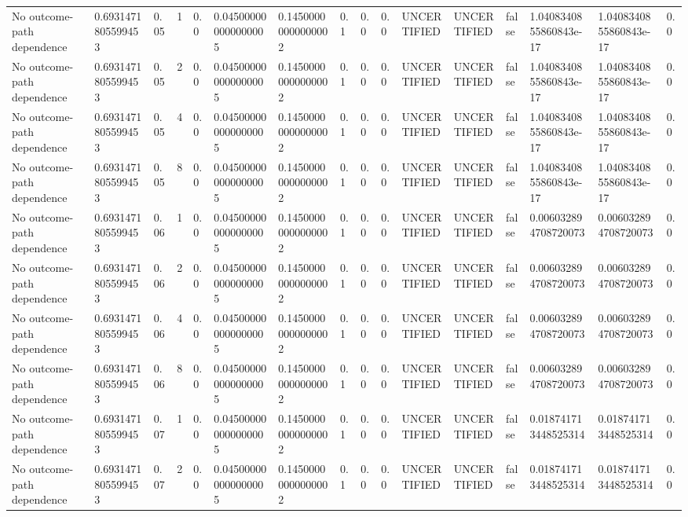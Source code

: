 \begin{tabular}{llllllllllllllll}
No outcome-path dependence & 0.6931471805599453 & 0.05 & 1 & 0.0 & 0.045000000000000005 & 0.14500000000000002 & 0.1 & 0.0 & 0.0 & UNCERTIFIED & UNCERTIFIED & false & 1.0408340855860843e-17 & 1.0408340855860843e-17 & 0.0 \\
No outcome-path dependence & 0.6931471805599453 & 0.05 & 2 & 0.0 & 0.045000000000000005 & 0.14500000000000002 & 0.1 & 0.0 & 0.0 & UNCERTIFIED & UNCERTIFIED & false & 1.0408340855860843e-17 & 1.0408340855860843e-17 & 0.0 \\
No outcome-path dependence & 0.6931471805599453 & 0.05 & 4 & 0.0 & 0.045000000000000005 & 0.14500000000000002 & 0.1 & 0.0 & 0.0 & UNCERTIFIED & UNCERTIFIED & false & 1.0408340855860843e-17 & 1.0408340855860843e-17 & 0.0 \\
No outcome-path dependence & 0.6931471805599453 & 0.05 & 8 & 0.0 & 0.045000000000000005 & 0.14500000000000002 & 0.1 & 0.0 & 0.0 & UNCERTIFIED & UNCERTIFIED & false & 1.0408340855860843e-17 & 1.0408340855860843e-17 & 0.0 \\
No outcome-path dependence & 0.6931471805599453 & 0.06 & 1 & 0.0 & 0.045000000000000005 & 0.14500000000000002 & 0.1 & 0.0 & 0.0 & UNCERTIFIED & UNCERTIFIED & false & 0.006032894708720073 & 0.006032894708720073 & 0.0 \\
No outcome-path dependence & 0.6931471805599453 & 0.06 & 2 & 0.0 & 0.045000000000000005 & 0.14500000000000002 & 0.1 & 0.0 & 0.0 & UNCERTIFIED & UNCERTIFIED & false & 0.006032894708720073 & 0.006032894708720073 & 0.0 \\
No outcome-path dependence & 0.6931471805599453 & 0.06 & 4 & 0.0 & 0.045000000000000005 & 0.14500000000000002 & 0.1 & 0.0 & 0.0 & UNCERTIFIED & UNCERTIFIED & false & 0.006032894708720073 & 0.006032894708720073 & 0.0 \\
No outcome-path dependence & 0.6931471805599453 & 0.06 & 8 & 0.0 & 0.045000000000000005 & 0.14500000000000002 & 0.1 & 0.0 & 0.0 & UNCERTIFIED & UNCERTIFIED & false & 0.006032894708720073 & 0.006032894708720073 & 0.0 \\
No outcome-path dependence & 0.6931471805599453 & 0.07 & 1 & 0.0 & 0.045000000000000005 & 0.14500000000000002 & 0.1 & 0.0 & 0.0 & UNCERTIFIED & UNCERTIFIED & false & 0.018741713448525314 & 0.018741713448525314 & 0.0 \\
No outcome-path dependence & 0.6931471805599453 & 0.07 & 2 & 0.0 & 0.045000000000000005 & 0.14500000000000002 & 0.1 & 0.0 & 0.0 & UNCERTIFIED & UNCERTIFIED & false & 0.018741713448525314 & 0.018741713448525314 & 0.0 \\

\end{tabular}
